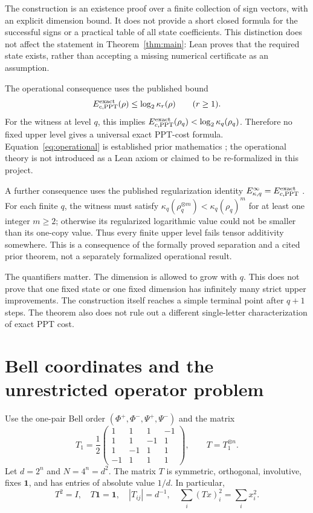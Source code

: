 \documentclass[11pt]{article}
\newcommand{\one}{\mathbf1}
\begin{document}
The construction is an existence proof over a finite collection of sign
vectors, with an explicit dimension bound. It does not provide a short
closed formula for the successful signs or a practical table of all state
coefficients. This distinction does not affect the statement in
Theorem~\ref{thm:main}: Lean proves that the required state exists, rather
than accepting a missing numerical certificate as an assumption.

The operational consequence uses the published bound
\begin{equation}\label{eq:operational}
E^{\rm exact}_{c,\rm PPT}(\rho)\le\log_2\kappa_r(\rho)
\qquad(r\ge1).
\end{equation}
For the witness at level $q$, this implies
$E^{\rm exact}_{c,\rm PPT}(\rho_q)<\log_2\kappa_q(\rho_q)$.
Therefore no fixed upper level gives a universal exact PPT-cost formula.
Equation~\eqref{eq:operational} is established prior mathematics
\cite[Theorem S26, Eq.\ (S89)]{LMR}; the operational theory is not introduced
as a Lean axiom or claimed to be re-formalized in this project.

A further consequence uses the published regularization identity
$E_{\kappa,q}^{\infty}=E^{\rm exact}_{c,\rm PPT}$
\cite[Remark S27, Eq.\ (S98)]{LMR}. For each finite $q$, the witness must
satisfy $\kappa_q(\rho_q^{\otimes m})<\kappa_q(\rho_q)^m$ for at least one
integer $m\ge2$; otherwise its regularized logarithmic value could not be
smaller than its one-copy value. Thus every finite upper level fails tensor additivity
somewhere. This is a consequence of the formally proved separation and a
cited prior theorem, not a separately formalized operational result.

The quantifiers matter. The dimension is allowed to grow with $q$. This
does not prove that one fixed state or one fixed dimension has infinitely
many strict upper improvements. The construction itself reaches a simple
terminal point after $q+1$ steps. The theorem also does not rule out a
different single-letter characterization of exact PPT cost.

\section{Bell coordinates and the unrestricted operator problem}
Use the one-pair Bell order $(\Phi^+,\Phi^-,\Psi^+,\Psi^-)$ and the matrix
\begin{equation}\label{eq:T}
T_1=\frac12\begin{pmatrix}
1&1&1&-1\\1&1&-1&1\\1&-1&1&1\\-1&1&1&1
\end{pmatrix},\qquad T=T_1^{\otimes n}.
\end{equation}
Let $d=2^n$ and $N=4^n=d^2$. The matrix $T$ is symmetric, orthogonal,
involutive, fixes $\one$, and has entries of absolute value $1/d$.
In particular,
\begin{equation}\label{eq:flat}
T^2=I,\quad T\one=\one,\quad |T_{ij}|=d^{-1},\quad
\sum_i(Tx)_i^2=\sum_i x_i^2.
\end{equation}
\end{document}
